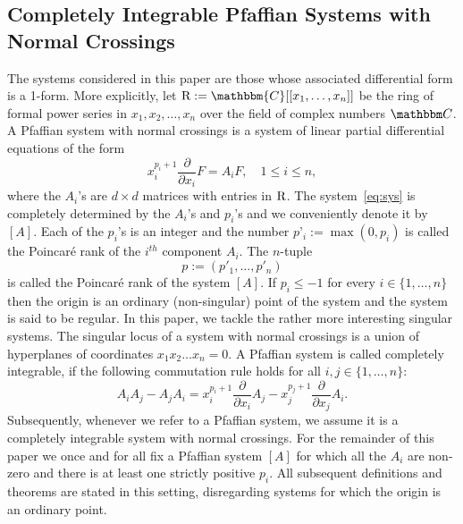 \documentclass[final,1p,times,number,amsthm]{elsart}
\let\set\mathbbm
\newcommand{\cfield}{\mathbbm{C}}
\newcommand{\ps}[2]{\cfield[[x_{#1},\dots,x_{#2}]]}
\newcommand{\pder}[2]{\frac{\partial}{\partial #2}#1}
\begin{document}
\subsection{Completely Integrable Pfaffian Systems with Normal Crossings}
\label{sec:prelimpfaff}
The systems considered in this paper are those whose associated differential
form is a 1-form. More explicitly, let ${\rm R}:=\ps{1}{n}$ be the ring of
formal power series in $x_1, x_2,\dots, x_n$ over the field of complex numbers
$\set C$. A Pfaffian system with normal crossings is a system of linear partial
differential equations of the form
\begin{equation}
  \label{eq:sys}
x_i^{p_i+1} \pder{F}{x_i} = A_iF, \quad 1 \leq  i \leq n,
\end{equation}
where the $A_i$'s are $d \times d$ matrices with entries in $\rm R$.  The
system~\eqref{eq:sys} is completely determined by the $A_i$'s and $p_i$'s and we
conveniently denote it by $[A]$. Each of the $p_i$'s is an integer and the
number $p’_i:=\max(0,p_i)$ is called the Poincar\'e rank of the $i^{th}$
component $A_i$.  The $n$-tuple
$$ p := (p'_1, \dots, p'_n)$$ is called the Poincar\'e rank of the system $[A]$.
If $p_i \leq -1$ for every $i \in \{1, \dots, n\}$ then the origin is an
ordinary (non-singular) point of the system and the system is said to be
regular. In this paper, we tackle the rather more interesting singular
systems. The singular locus of a system with normal crossings is a union of
hyperplanes of coordinates $x_1 x_2 \dots x_n =0$. A Pfaffian system is called
completely integrable, if the following commutation rule holds for all
$i,j\in\{1,\dots,n\}$:
\begin{equation}
  \label{eq:cond}
  A_iA_j - A_jA_i = x_i^{p_i+1}\pder{A_j}{x_i} - x_j^{p_j+1}\pder{A_i}{x_j}.
\end{equation}
Subsequently, whenever we refer to a Pfaffian system, we assume it is a
completely integrable system with normal crossings. For the remainder of this
paper we once and for all fix a Pfaffian system $[A]$ for which all the $A_i$
are non-zero and there is at least one strictly positive $p_i$. All subsequent
definitions and theorems are stated in this setting, disregarding systems for
which the origin is an ordinary point.
\end{document}
